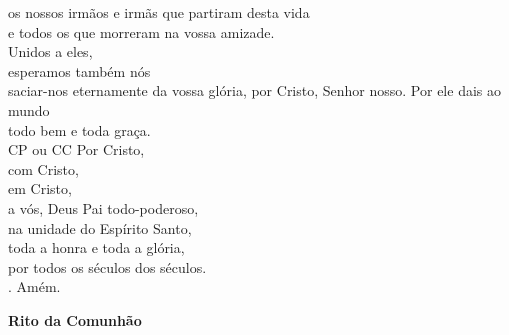 \documentclass{book}
\begin{document}
\begin{flushleft}
    os nossos irmãos e irmãs que partiram desta vida \\
    e todos os que morreram na vossa amizade. \\
    Unidos a eles, \\
    esperamos também nós \\
    saciar-nos eternamente da vossa glória,
    por Cristo, Senhor nosso.
    Por ele dais ao mundo \\
    todo bem e toda graça.
    \vspace{.2cm} \\
    {\color{VioletRed2}CP ou CC} Por Cristo, \\
    com Cristo, \\
    em Cristo, \\
    a vós, Deus Pai todo-poderoso, \\
    na unidade do Espírito Santo, \\
    toda a honra e toda a glória, \\
    por todos os séculos dos séculos.
    \vspace{.2cm} \\
    {\color{VioletRed2} \Rbar.} Amém.

\end{flushleft}
\begin{center}
    \textbf{Rito da Comunhão}
\end{center}
\end{document}

